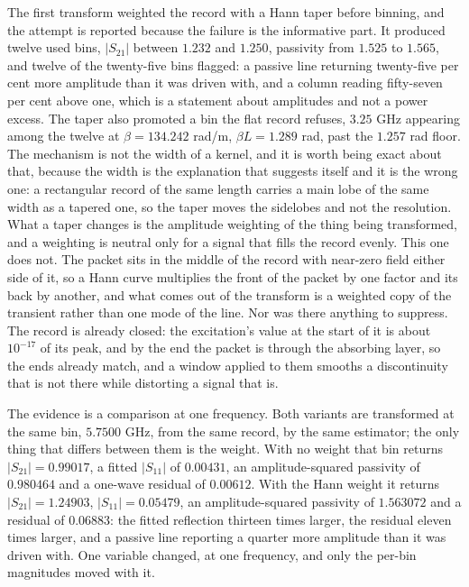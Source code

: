 The first transform weighted the record with a Hann taper before binning, and the attempt is reported because the
failure is the informative part. It produced twelve used bins, $|S_{21}|$ between $1.232$ and $1.250$, passivity
from $1.525$ to $1.565$, and twelve of the twenty-five bins flagged: a passive line returning twenty-five per cent
more amplitude than it was driven with, and a column reading fifty-seven per cent above one, which is a statement about amplitudes and not a power excess. The taper also promoted a bin
the flat record refuses, $3.25$ GHz appearing among the twelve at $\beta = 134.242$ rad/m, $\beta L = 1.289$ rad,
past the $1.257$ rad floor. The mechanism is not the width of a kernel, and it is worth being exact about that, because the width is the
explanation that suggests itself and it is the wrong one: a rectangular record of the same length carries a main
lobe of the same width as a tapered one, so the taper moves the sidelobes and not the resolution. What a taper
changes is the amplitude weighting of the thing being transformed, and a weighting is neutral only for a signal
that fills the record evenly. This one does not. The packet sits in the middle of the record with near-zero field
either side of it, so a Hann curve multiplies the front of the packet by one factor and its back by another, and
what comes out of the transform is a weighted copy of the transient rather than one mode of the line. Nor was
there anything to suppress. The record is already closed: the excitation's value at the start of it is about
$10^{-17}$ of its peak, and by the end the packet is through the absorbing layer, so the ends already match, and a
window applied to them smooths a discontinuity that is not there while distorting a signal that is.

The evidence is a comparison at one frequency. Both variants are transformed at the same bin, $5.7500$ GHz, from
the same record, by the same estimator; the only thing that differs between them is the weight. With no weight
that bin returns $|S_{21}| = 0.99017$, a fitted $|S_{11}|$ of $0.00431$, an amplitude-squared passivity of $0.980464$ and a one-wave
residual of $0.00612$. With the Hann weight it returns $|S_{21}| = 1.24903$, $|S_{11}| = 0.05479$, an amplitude-squared passivity of
$1.563072$ and a residual of $0.06883$: the fitted reflection thirteen times larger, the residual eleven times
larger, and a passive line reporting a quarter more amplitude than it was driven with. One variable changed, at
one frequency, and only the per-bin magnitudes moved with it.

